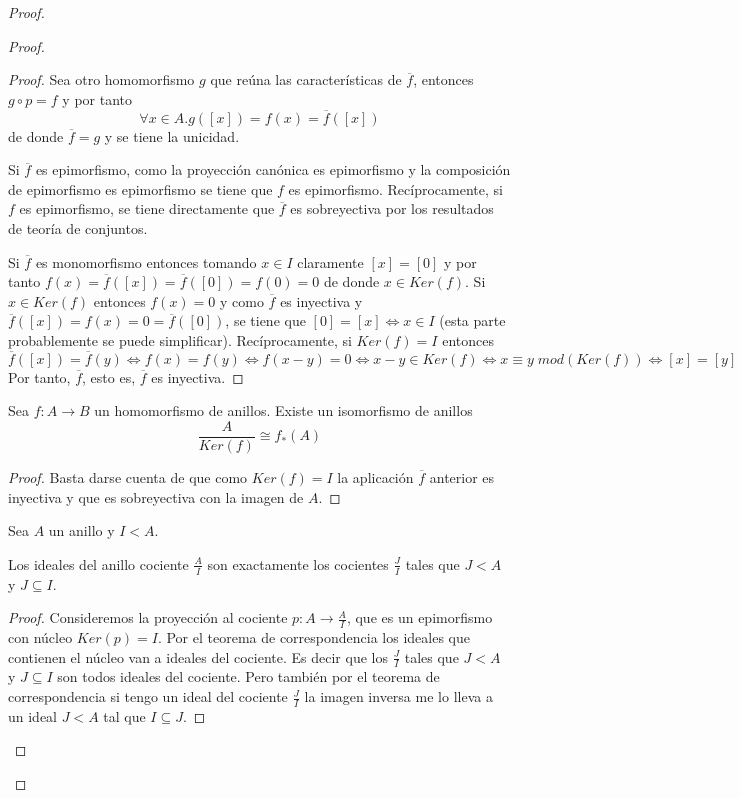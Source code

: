 \begin{proof}
\begin{proof}
\begin{proof}
	Sea otro homomorfismo $g$ que reúna las características de $\overline{f}$, entonces $g \circ p = f$ y por tanto $$\forall x \in A. g([x]) = f(x) = \overline{f}([x])$$ de donde $\overline{f} = g$ y se tiene la unicidad. 
	
	Si $\overline{f}$ es epimorfismo, como la proyección canónica es epimorfismo y la composición de epimorfismo es epimorfismo se tiene que $f$ es epimorfismo. Recíprocamente, si $f$ es epimorfismo, se tiene directamente que $\overline{f}$ es sobreyectiva por los resultados de  teoría de conjuntos. 
	
	Si $\overline{f}$ es monomorfismo entonces tomando $x \in I$ claramente $[x] = [0]$ y por tanto $f(x) = \overline{f}([x]) = \overline{f}([0]) = f(0) = 0$ de donde $x \in Ker(f)$. Si $x \in Ker(f)$ entonces $f(x) = 0$ y como $\overline{f}$ es inyectiva y $\overline{f}([x]) = f(x) = 0 = \overline{f}([0])$, se tiene que $[0] = [x] \iff x \in I$ (esta parte probablemente se puede simplificar). Recíprocamente, si $Ker(f) = I$ entonces $$\overline{f}([x]) = \overline{f}(y) \iff f(x) = f(y) \iff f(x-y) = 0 \iff x-y \in Ker(f) \iff x \equiv y \; mod(Ker(f)) \iff [x] = [y]$$ Por tanto, $\overline{f}$, esto es, $\overline{f}$ es inyectiva.
\end{proof}

\begin{corollary}
	Sea $f:A \to B$ un homomorfismo de anillos. Existe un isomorfismo de anillos $$\frac{A}{Ker(f)} \cong f_*(A)$$
\end{corollary}
\begin{proof}
	Basta darse cuenta de que como $Ker(f) = I$ la aplicación $\overline{f}$ anterior es inyectiva y que es sobreyectiva con la imagen de $A$. 
\end{proof}

\begin{proposition}
Sea $A$ un anillo y $I < A$. 

Los ideales del anillo cociente $\frac{A}{I}$ son exactamente los cocientes $\frac{J}{I}$ tales que $J < A$ y $J \subseteq I$. 
\end{proposition}
\begin{proof}
Consideremos la proyección al cociente $p:A \to \frac{A}{I}$, que es un epimorfismo con núcleo $Ker(p) = I$. Por el teorema de correspondencia los ideales que contienen el núcleo van a ideales del cociente. Es decir que los $\frac{J}{I}$ tales que $J < A$ y $J \subseteq I$ son todos ideales del cociente. Pero también por el teorema de correspondencia si tengo un ideal del cociente $\frac{J}{I}$ la imagen inversa me lo lleva a un ideal $J < A$ tal que $I \subseteq J$. 
\end{proof}


\end{proof}
\end{proof}
